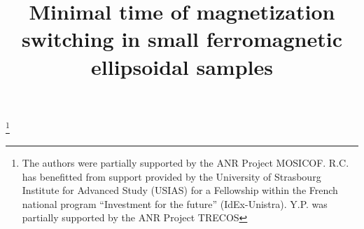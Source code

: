 \documentclass[JEP,XML,SOM,Unicode,NoEqCountersInSection,NoFloatCountersInSection,published]{cedram}
\theoremstyle{definition}
\begin{document}
\title{Minimal time of magnetization switching in small ferromagnetic ellipsoidal samples}

\author[\initial{R.} \lastname{Côte}]{ }
\address{IRMA, Université de Strasbourg, CNRS UMR 7501, Inria,\\
7 rue René Descartes, 67084 Strasbourg, France\\
\& University of Strasbourg Institute for Advanced Study (USIAS)}

\author[\initial{C.} \lastname{Courtès}]{ }
\address{IRMA, Université de Strasbourg, CNRS UMR 7501, Inria,\\
7 rue René Descartes, 67084 Strasbourg, France}

\author[\initial{G.} \lastname{Ferrière}]{\nobreakauthor {}}
\address{IRMA, Université de Strasbourg, CNRS UMR 7501, Inria,\\
7 rue René Descartes, 67084 Strasbourg, France}

\author[\initial{Y.} \lastname{Privat}]{ }
\address{Université de Lorraine, CNRS, Institut Elie Cartan de Lorraine, Inria,\\
BP 70239 54506 Vandœuvre-lès-Nancy Cedex, France\\
\& Institut Universitaire de France (IUF)}

\thanks{The authors were partially supported by the ANR Project MOSICOF. R.C. has benefitted from support provided by the University of Strasbourg Institute for Advanced Study (USIAS) for a Fellowship within the French national program ``Investment for the future'' (IdEx-Unistra). Y.P. was partially supported by the ANR Project TRECOS}
\end{document}
